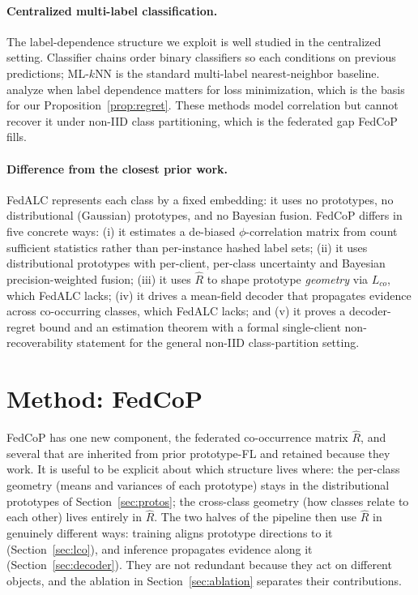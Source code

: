 \documentclass[11pt,a4paper]{article}
\theoremstyle{definition}
\newcommand{\Rhat}{\widehat{R}}
\begin{document}
\paragraph{Centralized multi-label classification.} The label-dependence structure we exploit is well studied in the centralized setting. Classifier chains \citep{read2011classifier} order binary classifiers so each conditions on previous predictions; ML-$k$NN \citep{zhang2007mlknn} is the standard multi-label nearest-neighbor baseline. \citep{dembczynski2012labeldependence} analyze when label dependence matters for loss minimization, which is the basis for our Proposition~\ref{prop:regret}. These methods model correlation but cannot recover it under non-IID class partitioning, which is the federated gap FedCoP fills.

\paragraph{Difference from the closest prior work.} FedALC \citep{an2024fedalc} represents each class by a fixed embedding: it uses no prototypes, no distributional (Gaussian) prototypes, and no Bayesian fusion. FedCoP differs in five concrete ways: (i) it estimates a de-biased $\phi$-correlation matrix from count sufficient statistics rather than per-instance hashed label sets; (ii) it uses distributional prototypes with per-client, per-class uncertainty and Bayesian precision-weighted fusion; (iii) it uses $\Rhat$ to shape prototype \emph{geometry} via $L_{co}$, which FedALC lacks; (iv) it drives a mean-field decoder that propagates evidence across co-occurring classes, which FedALC lacks; and (v) it proves a decoder-regret bound and an estimation theorem with a formal single-client non-recoverability statement for the general non-IID class-partition setting.

\section{Method: FedCoP}
\label{sec:method}

FedCoP has one new component, the federated co-occurrence matrix $\Rhat$, and several that are inherited from prior prototype-FL and retained because they work. It is useful to be explicit about which structure lives where: the per-class geometry (means and variances of each prototype) stays in the distributional prototypes of Section~\ref{sec:protos}; the cross-class geometry (how classes relate to each other) lives entirely in $\Rhat$. The two halves of the pipeline then use $\Rhat$ in genuinely different ways: training aligns prototype directions to it (Section~\ref{sec:lco}), and inference propagates evidence along it (Section~\ref{sec:decoder}). They are not redundant because they act on different objects, and the ablation in Section~\ref{sec:ablation} separates their contributions.
\end{document}
